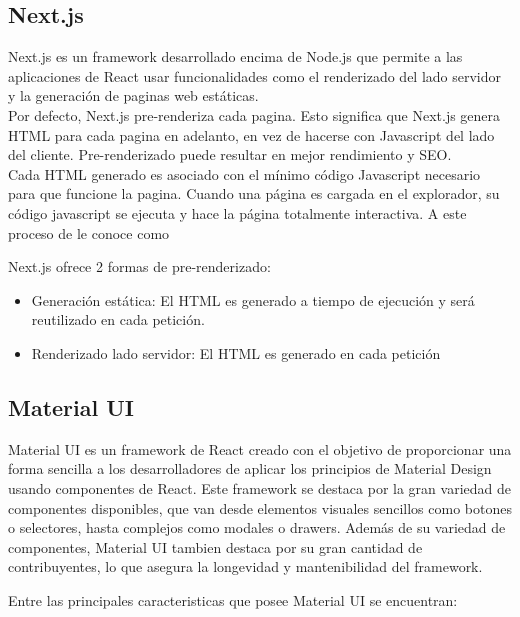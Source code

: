 \subsection{Next.js}

Next.js es un framework desarrollado encima de Node.js que permite a las aplicaciones de React usar funcionalidades como el renderizado del lado servidor y la generación de paginas web estáticas.\\

Por defecto, Next.js pre-renderiza cada pagina. Esto significa que Next.js genera HTML para cada pagina en adelanto, en vez de hacerse con Javascript del lado del cliente. Pre-renderizado puede resultar en mejor rendimiento y SEO.\\

Cada HTML generado es asociado con el mínimo código Javascript necesario para que funcione la pagina. Cuando una página es cargada en el explorador, su código javascript se ejecuta y hace la página totalmente interactiva. A este proceso de le conoce como 

Next.js ofrece 2 formas de pre-renderizado:

\begin{itemize}
    \item Generación estática: El HTML es generado a tiempo de ejecución y será reutilizado en cada petición.
    \item Renderizado lado servidor: El HTML es generado en cada petición
\end{itemize}

\subsection{Material UI}

Material UI es un framework de React creado con el objetivo de proporcionar una forma sencilla a los desarrolladores de aplicar los principios de Material Design \cite{MaterialDesignPrinciples} usando componentes de React. Este framework se destaca por la gran variedad de componentes disponibles, que van desde elementos visuales sencillos como botones o selectores, hasta complejos como modales o drawers. Además de su variedad de componentes, Material UI tambien destaca por su gran cantidad de contribuyentes, lo que asegura la longevidad y mantenibilidad del framework.

Entre las principales caracteristicas que posee Material UI se encuentran:

